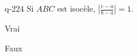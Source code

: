 \begin{truefalse}{q-224}
Si $ABC$ est isocèle, $\left|\frac{c-a}{b-a}\right|=1$.
\item Vrai
\item* Faux
\end{truefalse}

